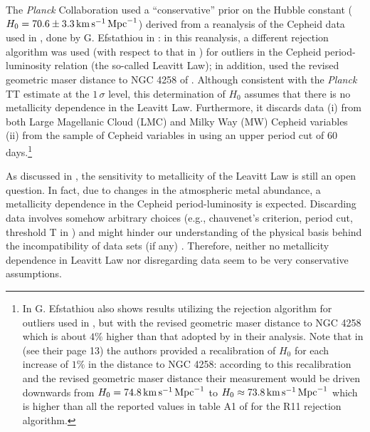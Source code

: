 The \textit{Planck} Collaboration used a ``conservative'' prior on the Hubble constant ($H_0=70.6\pm3.3\, \mathrm{km}\, \mathrm{s}^{-1}\, \mathrm{Mpc}^{-1}$) derived from a reanalysis of the Cepheid data used in \cite{Riess:2011yx}, done by G. Efstathiou in \cite{Efstathiou:2013via}: in this reanalysis, a different rejection algorithm was used (with respect to that in \cite{Riess:2011yx}) for outliers in the Cepheid period-luminosity relation (the so-called Leavitt Law); in addition, \cite{Efstathiou:2013via} used the revised geometric maser distance to NGC 4258 of \cite{Humphreys:2013eja}. Although consistent with the \textit{Planck} TT estimate at the $1\, \sigma$ level, this determination of $H_0$ assumes that there is no metallicity dependence in the Leavitt Law. Furthermore, it discards data (i) from both Large Magellanic Cloud (LMC) and Milky Way (MW) Cepheid variables (ii) from the sample of Cepheid variables in \cite{Riess:2011yx} using an upper period cut of $60$ days.\footnote{In \cite{Efstathiou:2013via} G. Efstathiou also shows results utilizing the rejection algorithm for outliers used in \cite{Riess:2011yx}, but with the revised geometric maser distance to NGC 4258 \cite{Humphreys:2013eja} which is about $4\%$ higher than that adopted by \cite{Riess:2011yx} in their analysis. Note that in \cite{Riess:2011yx} (see their page 13) the authors provided a recalibration of $H_0$ for each increase of $1\%$ in the distance to NGC 4258: according to this recalibration and the revised geometric maser distance their measurement would be driven downwards from $H_0 = 74.8\, \mathrm{km} \, \mathrm{s}^{-1}\, \mathrm{Mpc}^{-1}$ to $H_0 \approx 73.8 \, \mathrm{km} \, \mathrm{s}^{-1}\, \mathrm{Mpc}^{-1}$ which is higher than all the reported values in table A1 of \cite{Efstathiou:2013via} for the R11 rejection algorithm.}

As discussed in \cite{Freedman:2010xv}, the sensitivity to metallicity of the Leavitt Law is still an open question. In fact, due to changes in the atmospheric metal abundance, a metallicity dependence in the Cepheid period-luminosity is expected. Discarding data involves somehow arbitrary choices (e.g., chauvenet's criterion, period cut, threshold T in \cite{Efstathiou:2013via}) and might hinder our understanding of the physical basis behind the incompatibility of data sets (if any) \cite{Press:1996fw}. Therefore, neither no metallicity dependence in Leavitt Law nor disregarding data seem to be very conservative assumptions. 


